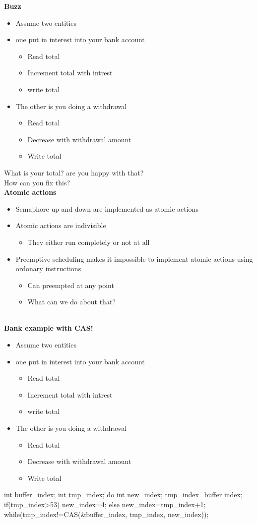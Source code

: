 \textbf{Buzz}
\begin{itemize}
\item Assume two entities
\item one put in interest into your bank account
\begin{itemize}
\item Read total
\item Increment total with intrest
\item write total
\end{itemize}
\item The other is you doing a withdrawal
\begin{itemize}
\item Read total
\item Decrease with withdrawal amount
\item Write total
\end{itemize}
\end{itemize}
What is your total? are you happy with that?\\
How can you fix this?\\
\textbf{Atomic actions}
\begin{itemize}
\item Semaphore up and down are implemented as atomic actions
\item Atomic actions are indivisible
\begin{itemize}
\item They either run completely or not at all
\end{itemize}
\item Preemptive scheduling makes it impossible to implement atomic actions using ordonary instructions
\begin{itemize}
\item Can preempted at any point
\item What can we do about that?
\end{itemize}
\end{itemize}\\
\textbf{Bank example with CAS!}
\begin{itemize}
\item Assume two entities
\item one put in interest into your bank account
\begin{itemize}
\item Read total
\item Increment total with intrest
\item write total
\end{itemize}
\item The other is you doing a withdrawal
\begin{itemize}
\item Read total
\item Decrease with withdrawal amount
\item Write total
\end{itemize}
\end{itemize}
\begin{cpp}
int buffer_index;
int tmp_index;
do {
int new_index;
tmp_index=buffer index;
if(tmp_index>53)
 new_index=4;
else
 new_index=tmp_index+1;
 } while(tmp_index!=CAS(&buffer_index, tmp_index, new_index));
\end{cpp}